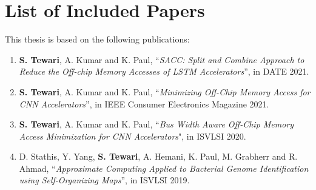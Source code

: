 \section*{List of Included Papers}
This thesis is based on the following publications:



\begin{enumerate}
\item \textbf{S. Tewari}, A. Kumar and K. Paul, ``\textit{SACC: Split and Combine Approach to Reduce the Off-chip Memory Accesses of LSTM Accelerators}'', in DATE 2021.

\item \textbf{S. Tewari}, A. Kumar and K. Paul, ``\textit{Minimizing Off-Chip Memory Access for CNN Accelerators}'', in IEEE Consumer Electronics Magazine 2021.

\item \textbf{S. Tewari}, A. Kumar and K. Paul, ``\textit{Bus Width Aware Off-Chip Memory Access Minimization for CNN Accelerators}", in ISVLSI 2020.

\item D. Stathis, Y. Yang, \textbf{S. Tewari}, A. Hemani, K. Paul, M. Grabherr and R. Ahmad, ``\textit{Approximate Computing Applied to Bacterial Genome Identification using Self-Organizing Maps}'', in ISVLSI 2019.

\setcounter{saveenum}{\value{enumi}}
\end{enumerate}



%
%
%
%



